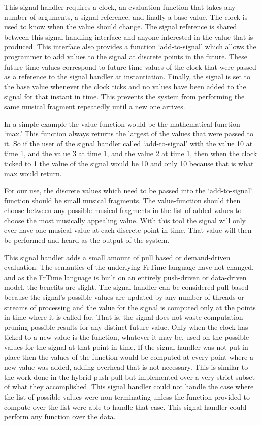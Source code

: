 \documentclass[12pt]{ucthesis}
\begin{document}
This signal handler requires a clock, an evaluation function that takes any number of arguments, a signal reference, and finally a base value. The clock is used to know when the value should change. The signal reference is shared between this signal handling interface and anyone interested in the value that is produced. This interface also provides a function `add-to-signal' which allows the programmer to add values to the signal at discrete points in the future. These future time values correspond to future time values of the clock that were passed as a reference to the signal handler at instantiation. Finally, the signal is set to the base value whenever the clock ticks and no values have been added to the signal for that instant in time. This prevents the system from performing the same musical fragment repeatedly until a new one arrives. 

In a simple example the value-function would be the mathematical function `max.' This function always returns the largest of the values that were passed to it. So if the user of the signal handler called `add-to-signal' with the value 10 at time 1, and the value 3 at time 1, and the value 2 at time 1, then when the clock ticked to 1 the value of the signal would be 10 and only 10 because that is what max would return. 

For our use, the discrete values which need to be passed into the `add-to-signal' function should be small musical fragments. The value-function should then choose between any possible musical fragments in the list of added values to choose the most musically appealing value.  With this tool the signal will only ever have one musical value at each discrete point in time. That value will then be performed and heard as the output of the system. 

This signal handler adds a small amount of pull based or demand-driven evaluation. The semantics of the underlying FrTime language have not changed, and as the FrTime language is built on an entirely push-driven or data-driven model, the benefits are slight. The signal handler can be considered pull based because the signal's possible values are updated by any number of threads or streams of processing and the value for the signal is computed only at the points in time where it is called for. That is, the signal does not waste computation pruning possible results for any distinct future value. Only when the clock has ticked to a new value is the function, whatever it may be, used on the possible values for the signal at that point in time. If the signal handler was not put in place then the values of the function would be computed at every point where a new value was added, adding overhead that is not necessary. This is similar to the work done in the hybrid push-pull but implemented over a very strict subset of what they accomplished. This signal handler could not handle the case where the list of possible values were non-terminating unless the function provided to compute over the list were able to handle that case. This signal handler could perform any function over the data. 
\end{document}
